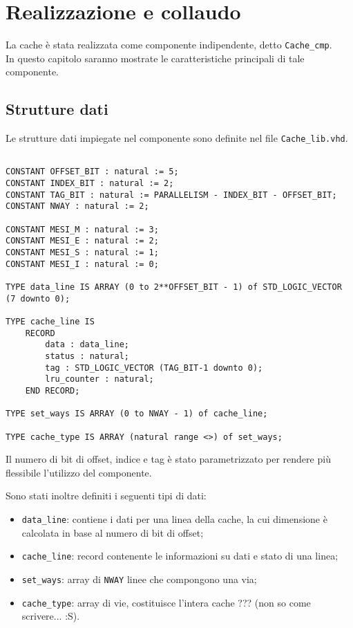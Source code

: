 \clearpage{\pagestyle{empty}\cleardoublepage}

\chapter{Realizzazione e collaudo}

La cache \`e stata realizzata come componente indipendente, detto \texttt{Cache\_cmp}.\\
In questo capitolo saranno mostrate le caratteristiche principali di tale componente.

\section{Strutture dati}

Le strutture dati impiegate nel componente sono definite nel file \texttt{Cache\_lib.vhd}.


\begin{lstlisting}

CONSTANT OFFSET_BIT : natural := 5;
CONSTANT INDEX_BIT : natural := 2;
CONSTANT TAG_BIT : natural := PARALLELISM - INDEX_BIT - OFFSET_BIT;
CONSTANT NWAY : natural := 2;

CONSTANT MESI_M : natural := 3;
CONSTANT MESI_E : natural := 2;
CONSTANT MESI_S : natural := 1;
CONSTANT MESI_I : natural := 0;

TYPE data_line IS ARRAY (0 to 2**OFFSET_BIT - 1) of STD_LOGIC_VECTOR (7 downto 0);

TYPE cache_line IS 
	RECORD
		data : data_line;
		status : natural;
		tag : STD_LOGIC_VECTOR (TAG_BIT-1 downto 0);
		lru_counter : natural;
	END RECORD;

TYPE set_ways IS ARRAY (0 to NWAY - 1) of cache_line;
		
TYPE cache_type IS ARRAY (natural range <>) of set_ways;
\end{lstlisting}


Il numero di bit di offset, indice e tag \`e stato parametrizzato per rendere pi\`u flessibile l'utilizzo del componente.

Sono stati inoltre definiti i seguenti tipi di dati:
\begin{itemize}
  \item \texttt{data\_line}: contiene i dati per una linea della cache, la cui dimensione \`e calcolata in base al numero di bit di offset;
  \item \texttt{cache\_line}: record contenente le informazioni su dati e stato di una linea;
  \item \texttt{set\_ways}: array di \texttt{NWAY} linee che compongono una via;
  \item \texttt{cache\_type}: array di vie, costituisce l'intera cache ??? (non so come scrivere... :S).
\end{itemize}

